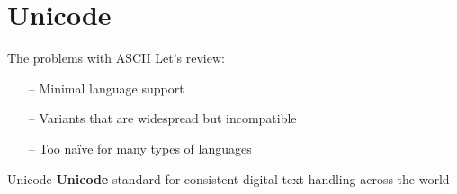 \documentclass[../index.tex]{subfiles}
\begin{document}
\renewcommand{\sectiontitle}{Unicode}
\section{\sectiontitle}
%
%

\renewcommand{\currenttitle}{The problems with ASCII}
\begin{frame}{\currenttitle}
%
%
%
  Let's review: \\

  \begin{itemize}
    \item[--] Minimal language support
    \item[--] Variants that are widespread but incompatible
    \item[--] Too naïve for many types of languages
  \end{itemize}
\end{frame}

\renewcommand{\currenttitle}{Unicode}
\begin{frame}{\currenttitle}
%
%
  \textbf{Unicode} \textendash{} standard for consistent digital text handling across the world
\end{frame}
\end{document}
